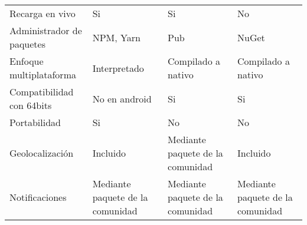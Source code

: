 \begin{longtable}{|p{5cm}|p{3cm}|p{3cm}|p{3cm}|}
    Recarga en vivo                                & Si                                                        & Si                                                                                                             & No                                                                                                                           \\
    Administrador de paquetes                      & NPM, Yarn                                                 & Pub                                                                                                            & NuGet                                                                                                                        \\
    Enfoque multiplataforma                        & Interpretado                                              & Compilado a nativo                                                                                             & Compilado a nativo                                                                                                           \\
    Compatibilidad con 64bits                      & No en android                                             & Si                                                                                                             & Si                                                                                                                           \\
    Portabilidad                                   & Si                                                        & No                                                                                                             & No                                                                                                                           \\
    Geolocalización                                & Incluido                                                  & Mediante paquete de la comunidad                                                                               & Incluido                                                                                                                     \\
    Notificaciones                                 & Mediante paquete de la comunidad                          & Mediante paquete de la comunidad                                                                               & Mediante paquete de la comunidad                                                                                             \\

\end{longtable}
